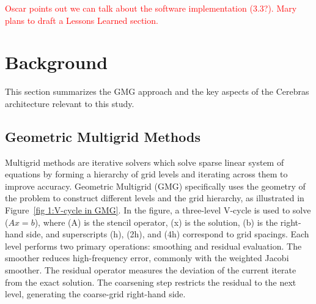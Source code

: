 \documentclass[sigconf]{acmart}
\begin{document}
\textcolor{red}{
Oscar points out we can talk about the software implementation (3.3?). Mary plans to draft a Lessons Learned section.}

\section{Background}
This section summarizes the GMG approach and the key aspects of the Cerebras architecture relevant to this study.

\subsection{Geometric Multigrid Methods}

Multigrid methods are iterative solvers which solve sparse linear system of equations by forming a hierarchy of grid levels and iterating across them to %
improve accuracy.  %
Geometric Multigrid (GMG) specifically uses the geometry of the problem to construct different levels and the grid hierarchy, as illustrated in Figure~\ref{fig 1:V-cycle in GMG}. 
In the figure, 
a three-level V-cycle is used to solve ($Ax = b$), where (A) is the stencil operator, (x) is the solution, (b) is the right-hand side, and superscripts (h), (2h), and (4h) correspond to grid spacings. Each level performs two primary operations: smoothing and residual evaluation. The smoother reduces high-frequency error, commonly with %
the weighted Jacobi smoother. %
The residual operator %
measures the deviation of the current iterate from the exact solution. The coarsening step restricts the residual to the next level, generating the coarse-grid right-hand side. %
\end{document}
